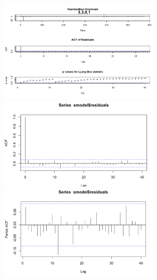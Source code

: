 \documentclass[a4paper,11pt]{article}
\begin{document}
    \begin{figure}[H]
        \centering
        \includegraphics[width=0.7\textwidth]{figure-markdown_strict/3-3-0-1.png}
        \includegraphics[width=0.7\textwidth]{figure-markdown_strict/3-3-0-1.1.png}
        \includegraphics[width=0.7\textwidth]{figure-markdown_strict/3-3-0-1.2.png}
        \label{fig:f8}
    \end{figure}
\end{document}
